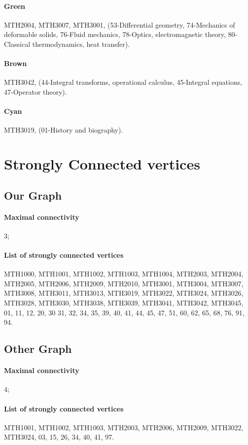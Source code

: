 \documentclass[english, 12pt]{article}
\begin{document}
\paragraph{Green} MTH2004, MTH3007, MTH3001, (53-Differential geometry, 74-Mechanics of deformable solids, 76-Fluid mechanics, 78-Optics, electromagnetic theory, 80-Classical thermodynamics, heat transfer).
\paragraph{Brown} MTH3042, (44-Integral transforms, operational calculus, 45-Integral equations, 47-Operator theory).
\paragraph{Cyan} MTH3019, (01-History and biography).
\parskip=0.0pt

\section{Strongly Connected vertices} \label{app:strongly_connected_vertices}
\subsection{Our Graph}
\paragraph{Maximal connectivity} 3;
\parskip=-8.0pt
\paragraph{List of strongly connected vertices} MTH1000, MTH1001, MTH1002, MTH1003, MTH1004, MTH2003, MTH2004, MTH2005, MTH2006, MTH2009, MTH2010, MTH3001, MTH3004, MTH3007, MTH3008, MTH3011, MTH3013, MTH3019, MTH3022, MTH3024, MTH3026, MTH3028, MTH3030, MTH3038, MTH3039, MTH3041, MTH3042, MTH3045, 01, 11, 12, 20, 30 31, 32, 34, 35, 39, 40, 41, 44, 45, 47, 51, 60, 62, 65, 68, 76, 91, 94.
\parskip=0.0pt

\subsection{Other Graph}
\paragraph{Maximal connectivity} 4;
\parskip=-8.0pt
\paragraph{List of strongly connected vertices} MTH1001, MTH1002, MTH1003, MTH2003, MTH2006, MTH2009, MTH3022, MTH3024, 03, 15, 26, 34, 40, 41, 97.
\parskip=0.0pt
\end{document}
